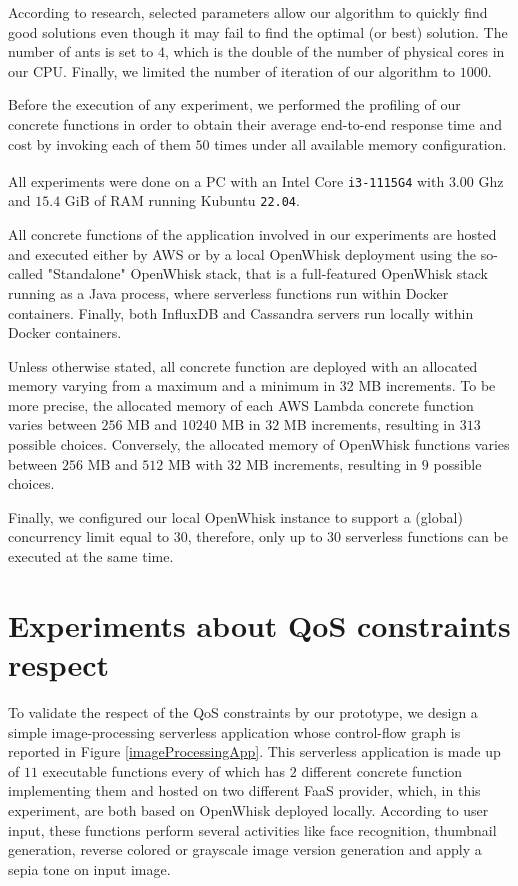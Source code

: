 \documentclass[12pt,a4paper]{report}
\begin{document}
According to \citet{acosemplice} research, selected parameters allow our algorithm to quickly find good solutions even though it may fail to find the optimal (or best) solution. The number of ants is set to $4$, which is the double of the number of physical cores in our CPU. Finally, we limited the number of iteration of our algorithm to $1000$.

Before the execution of any experiment, we performed the profiling of our concrete functions in order to obtain their average end-to-end response time and cost by invoking each of them $50$ times under all available memory configuration.

All experiments were done on a PC with an Intel\textsuperscript{\textregistered} Core\textsuperscript{\texttrademark} \texttt{i3-1115G4} with $3.00$ Ghz and $15.4$ GiB of RAM running Kubuntu \texttt{22.04}.

All concrete functions of the application involved in our experiments are hosted and executed either by AWS or by a local OpenWhisk deployment using the so-called "Standalone" OpenWhisk stack, that is a full-featured OpenWhisk stack running as a Java process, where serverless functions run within Docker containers. Finally, both InfluxDB and Cassandra servers run locally within Docker containers.

Unless otherwise stated, all concrete function are deployed with an allocated memory varying from a maximum and a minimum in $32$ MB increments. To be more precise, the allocated memory of each AWS Lambda concrete function varies between $256$ MB and $10240$ MB in $32$ MB increments, resulting in $313$ possible choices. Conversely, the allocated memory of OpenWhisk functions varies between $256$ MB and $512$ MB with $32$ MB increments, resulting in $9$ possible choices. 

Finally, we configured our local OpenWhisk instance to support a (global) concurrency limit equal to $30$, therefore, only up to $30$ serverless functions can be executed at the same time.

\section{Experiments about QoS constraints respect}

To validate the respect of the QoS constraints by our prototype, we design a simple image-processing serverless application whose control-flow graph is reported in Figure \ref{imageProcessingApp}. This serverless application is made up of $11$ executable functions every of which has $2$ different concrete function implementing them and hosted on two different FaaS provider, which, in this experiment, are both based on OpenWhisk deployed locally. According to user input, these functions perform several activities like face recognition, thumbnail generation, reverse colored or grayscale image version generation and apply a sepia tone on input image.
\end{document}
